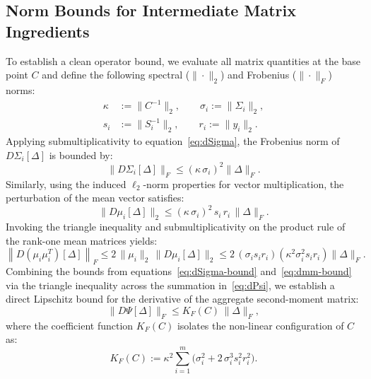 \documentclass[11pt]{article}
\begin{document}
\subsection{Norm Bounds for Intermediate Matrix Ingredients}
To establish a clean operator bound, we evaluate all matrix quantities at the base point $C$ and define the following spectral ($\|\cdot\|_2$) and Frobenius ($\|\cdot\|_F$) norms:
\begin{align*}
\kappa &:= \|C^{-1}\|_2, \qquad \sigma_i := \|\Sigma_i\|_2, \\
s_i    &:= \|S_i^{-1}\|_2, \qquad r_i := \|y_i\|_2.
\end{align*}
Applying submultiplicativity to equation~\eqref{eq:dSigma}, the Frobenius norm of $D\Sigma_i[\Delta]$ is bounded by:
\begin{equation}\label{eq:dSigma-bound}
\|D\Sigma_i[\Delta]\|_F \le (\kappa\,\sigma_i)^2 \|\Delta\|_F.
\end{equation}
Similarly, using the induced $\ell_2$-norm properties for vector multiplication, the perturbation of the mean vector satisfies:
\begin{equation}\label{eq:dmu-bound}
\|D\mu_i[\Delta]\|_2 \le (\kappa\,\sigma_i)^2\, s_i\,r_i\,\|\Delta\|_F.
\end{equation}
Invoking the triangle inequality and submultiplicativity on the product rule of the rank-one mean matrices yields:
\begin{equation}\label{eq:dmm-bound}
\left\|D(\mu_i\mu_i^T)[\Delta]\right\|_F \le 2\,\|\mu_i\|_2\,\|D\mu_i[\Delta]\|_2 \le 2\, (\sigma_i s_i r_i)\left(\kappa^2\sigma_i^2 s_i r_i\right)\|\Delta\|_F.
\end{equation}
Combining the bounds from equations~\eqref{eq:dSigma-bound} and~\eqref{eq:dmm-bound} via the triangle inequality across the summation in~\eqref{eq:dPsi}, we establish a direct Lipschitz bound for the derivative of the aggregate second-moment matrix:
\begin{equation}\label{eq:Kf-def}
\|D\Psi[\Delta]\|_F \le K_F(C)\,\|\Delta\|_F,
\end{equation}
where the coefficient function $K_F(C)$ isolates the non-linear configuration of $C$ as:
\begin{equation}
K_F(C) := \kappa^2 \sum_{i=1}^m \Big( \sigma_i^2 + 2\,\sigma_i^3 s_i^2 r_i^2 \Big).
\end{equation}
\end{document}
